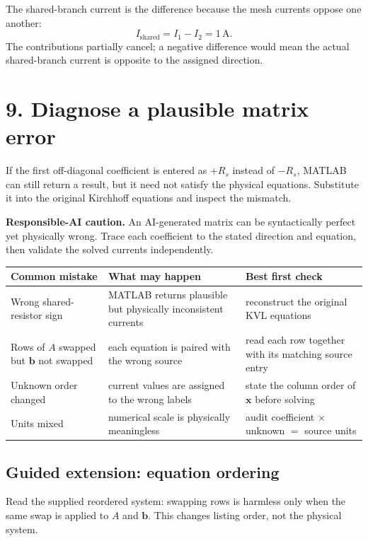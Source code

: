 \documentclass[11pt,a4paper]{article}
\newcommand{\units}[1]{\,\mathrm{#1}}
\begin{document}
The shared-branch current is the difference because the mesh currents oppose one another:
\[
I_{\mathrm{shared}}=I_1-I_2=1\units{A}.
\]
The contributions partially cancel; a negative difference would mean the actual shared-branch current is opposite to the assigned direction.

\section*{9. Diagnose a plausible matrix error}
If the first off-diagonal coefficient is entered as $+R_s$ instead of $-R_s$, MATLAB can still return a result, but it need not satisfy the physical equations. Substitute it into the original Kirchhoff equations and inspect the mismatch.

\begin{aibox}\textbf{Responsible-AI caution.} An AI-generated matrix can be syntactically perfect yet physically wrong. Trace each coefficient to the stated direction and equation, then validate the solved currents independently.\end{aibox}

\begin{center}
\small
\begin{tabular}{>{\raggedright\arraybackslash}p{.23\linewidth}>{\raggedright\arraybackslash}p{.31\linewidth}>{\raggedright\arraybackslash}p{.34\linewidth}}
\toprule
\textbf{Common mistake} & \textbf{What may happen} & \textbf{Best first check}\\
\midrule
Wrong shared-resistor sign & MATLAB returns plausible but physically inconsistent currents & reconstruct the original KVL equations\\
Rows of $A$ swapped but $\mathbf b$ not swapped & each equation is paired with the wrong source & read each row together with its matching source entry\\
Unknown order changed & current values are assigned to the wrong labels & state the column order of $\mathbf x$ before solving\\
Units mixed & numerical scale is physically meaningless & audit coefficient $\times$ unknown $=$ source units\\
\bottomrule
\end{tabular}
\end{center}

\subsection*{Guided extension: equation ordering}
Read the supplied reordered system: swapping rows is harmless only when the same swap is applied to $A$ and $\mathbf b$. This changes listing order, not the physical system.
\end{document}
